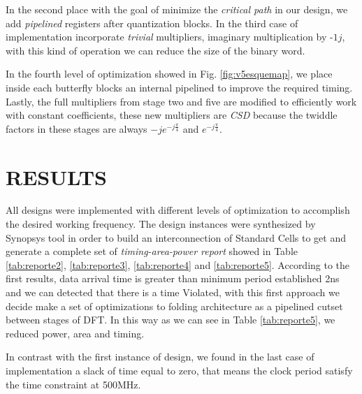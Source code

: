 \documentclass[journal,comsoc]{IEEEtran}
\begin{document}
In the second place with the goal of minimize the \textit{critical path} in our design, we add \textit{pipelined} registers after quantization blocks. In the third case of implementation incorporate \textit{trivial} multipliers, imaginary multiplication by -$1j$, with this kind of operation we can reduce the size of the binary word. 

In the fourth level of optimization showed in Fig. \ref{fig:v5esquemap}, we place inside each butterfly blocks an internal pipelined to improve the required timing. Lastly, the full multipliers from stage two and five are modified to efficiently work with constant coefficients, these new multipliers are \textit{CSD} because the twiddle factors in these stages are always $-je^{-j\frac{\pi}{4}}$ and $e^{-j\frac{\pi}{4}}$.


\section{RESULTS}
All designs were implemented with different levels of optimization to accomplish the desired working frequency. The design instances were synthesized by Synopsys tool in order to build an interconnection of Standard Cells to get and generate a complete set of \textit{timing-area-power report} showed in Table \ref{tab:reporte2}, \ref{tab:reporte3}, \ref{tab:reporte4} and  \ref{tab:reporte5}. According to the first results, data arrival time is greater than minimum period established 2ns and we can detected that there is a time Violated, with this first approach we decide make a set of optimizations to folding architecture as a pipelined cutset between stages of DFT. In this way as we can see in Table \ref{tab:reporte5}, we reduced power, area and timing. 

In contrast with the first instance of design, we found in the last case of implementation a slack of time equal to zero, that means the clock period satisfy the time constraint at 500MHz.
\end{document}
